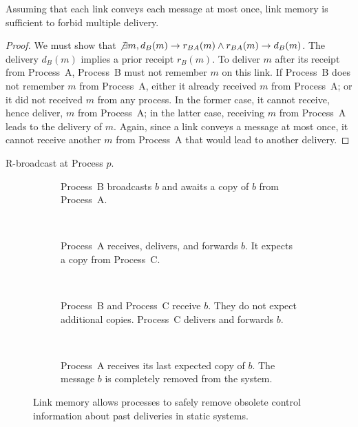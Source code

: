 \begin{theorem}
  Assuming that each link conveys each message at most once, link memory is
  sufficient to forbid multiple delivery.
\end{theorem}

\begin{proof}
  We must show that
  $\not\exists m, d_B(m) \rightarrow r_{BA}(m) \wedge r_{BA}(m) \rightarrow
  d_B(m)$.
  The delivery $d_B(m)$ implies a prior receipt $r_B(m)$.  To deliver $m$ after
  its receipt from Process~A, Process~B must not remember $m$ on this link.  If
  Process~B does not remember $m$ from Process~A, either it already received $m$
  from Process~A; or it did not received $m$ from any process. In the former
  case, it cannot receive, hence deliver, $m$ from Process~A; in the latter
  case, receiving $m$ from Process~A leads to the delivery of $m$. Again, since
  a link conveys a message at most once, it cannot receive another $m$ from
  Process~A that would lead to another delivery.
\end{proof}


\begin{algorithm}[h]
  
  \caption{\label{algo:reliablebroadcast}R-broadcast at Process $p$.}
\end{algorithm}

\begin{figure}
  \begin{center}
    \begin{subfigure}[t]{0.23\textwidth}
      \centering%
      \caption{\label{fig:memorylinkA}Process~B broadcasts $b$ and awaits a copy
        of $b$ from Process~A.}
    \end{subfigure}
    ~
    \begin{subfigure}[t]{0.23\textwidth}
      \centering%
      \caption{\label{fig:memorylinkB}Process~A receives, delivers, and forwards
        $b$. It expects a copy from Process~C.}
    \end{subfigure}
    ~
    \begin{subfigure}[t]{0.23\textwidth}
      \centering%
      \caption{\label{fig:memorylinkC}Process~B and Process~C receive $b$. They
        do not expect additional copies. Process~C delivers and forwards $b$.}
    \end{subfigure}
    ~
    \begin{subfigure}[t]{0.23\textwidth}
      \centering%
      \caption{\label{fig:memorylinkD}Process~A receives its last expected copy
        of $b$. The message $b$ is completely removed from the system.}
    \end{subfigure}
    \caption{\label{fig:memorylink}Link memory allows processes to safely remove
      obsolete control information about past deliveries in static systems.}
  \end{center}
\end{figure}



